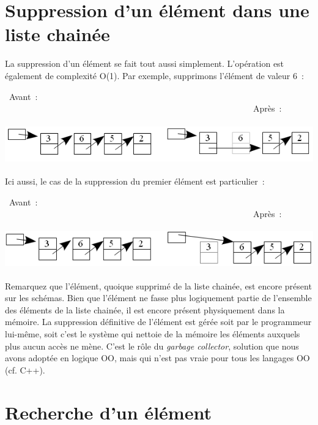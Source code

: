 	
\section{Suppression d'un élément dans une liste chainée}
	
	La suppression d'un élément se fait tout aussi simplement. 
	L'opération est également de complexité O(1). Par exemple,
	supprimons l'élément de valeur 6~: 
	
	
	\ Avant~: \ \ \ \ \ \ \ \ \ \ \ \ \ \ \ \ \ \ \ \ \ \ \ \ \ \ \ \ \ \ \ \ \ \ \ \ \ \ \ \ \ \ \ \ \ \ \ \ \ \ \ \ \ \ \ \ \ \ Après~:

	\includegraphics[width=15.61cm,height=1.773cm]{image/a2012Logique2eme-img006.png} 

	Ici aussi, le cas de la suppression du premier élément est particulier~:

	\ Avant~: \ \ \ \ \ \ \ \ \ \ \ \ \ \ \ \ \ \ \ \ \ \ \ \ \ \ \ \ \ \ \ \ \ \ \ \ \ \ \ \ \ \ \ \ \ \ \ \ \ \ \ \ \ \ \ \ \ \ Après~:

	\includegraphics[width=15.425cm,height=1.72cm]{image/a2012Logique2eme-img007.png} 

	Remarquez que l'élément, quoique supprimé de la liste chainée, 
	est encore présent sur les schémas. Bien que l'élément ne
	fasse plus logiquement partie de l'ensemble des éléments 
	de la liste chainée, il est encore présent physiquement dans
	la mémoire. La suppression définitive de l'élément est gérée 
	soit par le programmeur lui-même, soit c'est le système
	qui nettoie de la mémoire les éléments auxquels plus aucun accès ne mène. 
	C'est le rôle du \textit{garbage collector},
	solution que nous avons adoptée en logique OO, 
	mais qui n'est pas vraie pour tous les langages OO (cf. C++).



\section{Recherche d'un élément}

